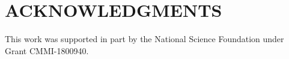 \documentclass[letterpaper, 10 pt, conference]{ieeeconf}  %
\begin{document}

\section*{ACKNOWLEDGMENTS} 
This work was supported in part by the National Science Foundation under Grant CMMI-1800940.







%
\end{document}
